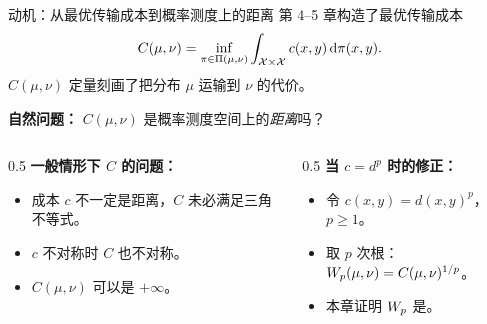 
\begin{frame}{动机：从最优传输成本到概率测度上的距离}
  第 4--5 章构造了最优传输成本
  \[
    C(\mu,\nu) = \inf_{\pi\in\Pi(\mu,\nu)} \int_{\mathcal{X}\times\mathcal{X}} c(x,y)\,\mathrm{d}\pi(x,y).
  \]
  $C(\mu,\nu)$ 定量刻画了把分布 $\mu$ 运输到 $\nu$ 的代价。

  \textbf{自然问题：} $C(\mu,\nu)$ 是概率测度空间上的\emph{距离}吗？

  \begin{columns}[T]
    \begin{column}{0.5\textwidth}
      \textbf{一般情形下 $C$ 的问题：}
      \begin{itemize}
        \item 成本 $c$ 不一定是距离，$C$ 未必满足三角不等式。
        \item $c$ 不对称时 $C$ 也不对称。
        \item $C(\mu,\nu)$ 可以是 $+\infty$。
      \end{itemize}
    \end{column}
    \begin{column}{0.5\textwidth}
      \textbf{当 $c=d^{p}$ 时的修正：}
      \begin{itemize}
        \item 令 $c(x,y)=d(x,y)^{p}$，$p\ge1$。
        \item 取 $p$ 次根：$W_{p}(\mu,\nu)=C(\mu,\nu)^{1/p}$。
        \item 本章证明 $W_{p}$ 是。
      \end{itemize}
    \end{column}
  \end{columns}

\end{frame}

